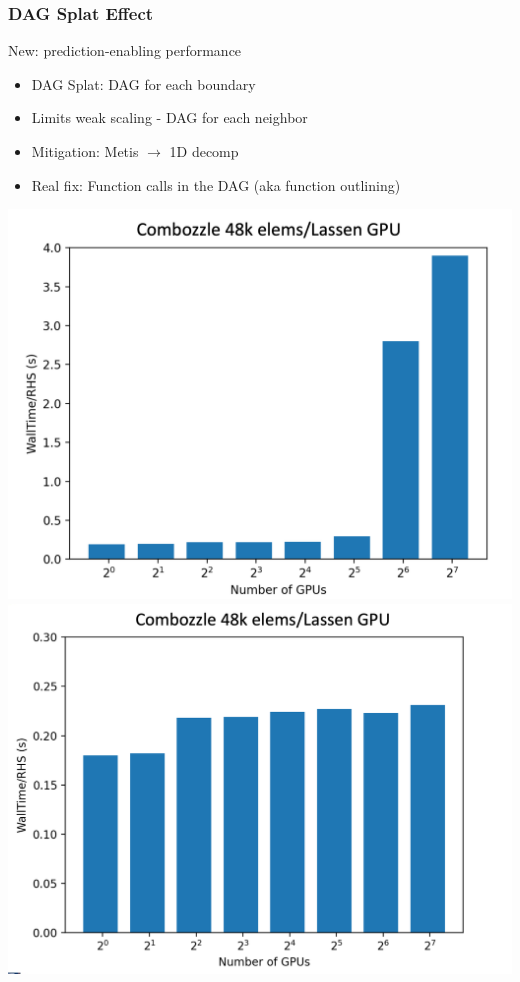 \begin{frame}\frametitle{DAG Splat Effect}
\begin{minipage}[t][0.4\textheight][t]{\textwidth}
\begin{center}
New: prediction-enabling performance
\end{center}
\begin{multicols}{2}
\begin{itemize}
\item DAG Splat: DAG for each boundary
\item Limits weak scaling - DAG for each neighbor
\columnbreak
\item Mitigation: Metis $\to$ 1D decomp
\item Real fix: Function calls in the DAG (aka function outlining)
\end{itemize}
\end{multicols}
\end{minipage}\vfill
\vspace{-20pt}
\begin{minipage}[t][0.4\textheight][t]{\textwidth}
\centering
\includegraphics[width=.4\textwidth]{Figures/mtc/combozzle_weak_bad_partitioning.png}\hspace{30pt}
\includegraphics[width=.4\textwidth]{Figures/mtc/combozzle_weak_sliced_partitioning.png}
\end{minipage}
\end{frame}

